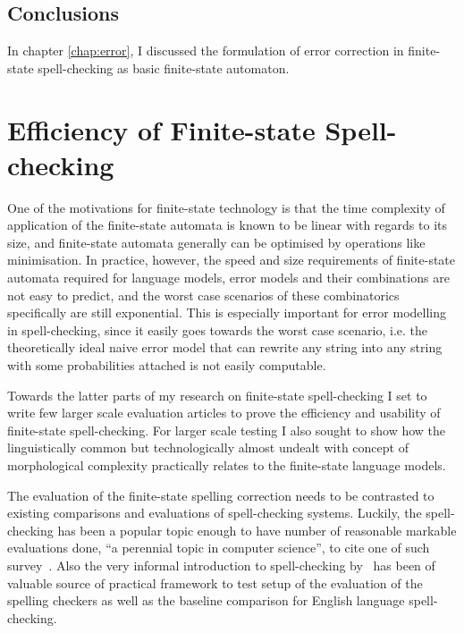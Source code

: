 \documentclass[officiallayout,draft]{unihelcompling}
\begin{document}
\section{Conclusions}

In chapter \ref{chap:error}, I discussed the formulation of error correction in
finite-state spell-checking as basic finite-state automaton. 

\chapter{Efficiency of Finite-state Spell-checking}
\label{chap:efficiency}

One of the motivations for finite-state technology is that the time complexity
of application of the finite-state automata is known to be linear with regards
to its size, and finite-state automata generally can be optimised by operations
like minimisation. In practice, however, the speed and size requirements of
finite-state automata required for language models, error models and their
combinations are not easy to predict, and the worst case scenarios of these
combinatorics specifically are still exponential. This is especially important
for error modelling in spell-checking, since it easily goes towards the worst
case scenario, i.e. the theoretically ideal naive error model that can rewrite
any string into any string with some probabilities attached is not easily
computable.

Towards the latter parts of my research on finite-state spell-checking I set to
write few larger scale evaluation articles to prove the efficiency and
usability of finite-state spell-checking. For larger scale testing I also
sought to show how the linguistically common but technologically almost
undealt with concept of morphological complexity practically relates to the
finite-state language models.

The evaluation of the finite-state spelling correction needs to be contrasted
to existing comparisons and evaluations of spell-checking systems. Luckily, the
spell-checking has been a popular topic enough to have number of reasonable
markable evaluations done, ``a perennial topic in computer science'', to cite
one of such survey~\cite{kukich1992spelling}. Also the very informal
introduction to spell-checking by~\cite{norvig2010howto} has been of valuable
source of practical framework to test setup of the evaluation of the spelling
checkers as well as the baseline comparison for English language
spell-checking.
\end{document}
